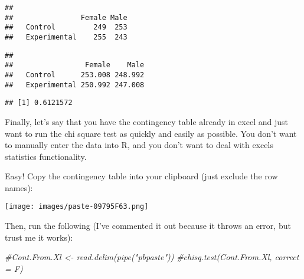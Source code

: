 \documentclass[
]{book}
\newenvironment{Shaded}{\begin{snugshade}}{\end{snugshade}}
\newcommand{\CommentTok}[1]{\textcolor[rgb]{0.56,0.35,0.01}{\textit{#1}}}
\newcommand{\NormalTok}[1]{#1}
\newcommand{\SpecialCharTok}[1]{\textcolor[rgb]{0.00,0.00,0.00}{#1}}
\theoremstyle{definition}
\theoremstyle{definition}
\theoremstyle{definition}
\theoremstyle{definition}
\theoremstyle{remark}
\begin{document}
\begin{verbatim}
##               
##                Female Male
##   Control         249  253
##   Experimental    255  243
\end{verbatim}

\begin{Shaded}
\end{Shaded}

\begin{verbatim}
##               
##                 Female    Male
##   Control      253.008 248.992
##   Experimental 250.992 247.008
\end{verbatim}

\begin{Shaded}
\end{Shaded}

\begin{verbatim}
## [1] 0.6121572
\end{verbatim}

Finally, let's say that you have the contingency table already in excel and just want to run the chi square test as quickly and easily as possible. You don't want to manually enter the data into R, and you don't want to deal with excels statistics functionality.

Easy! Copy the contingency table into your clipboard (just exclude the row names):

\texttt{[image: images/paste-09795F63.png]}

Then, run the following (I've commented it out because it throws an error, but trust me it works):

\begin{Shaded}
\begin{Highlighting}[]
\CommentTok{\#Cont.From.Xl \textless{}{-} read.delim(pipe("pbpaste"))}
\CommentTok{\#chisq.test(Cont.From.Xl, correct = F)}
\end{Highlighting}
\end{Shaded}


  
\end{document}
